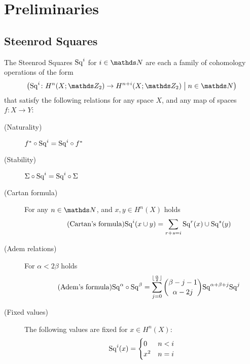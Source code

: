 % 

\chapter{Preliminaries}
\section{Steenrod Squares}

\begin{Def} %
  The Steenrod Squares $\mathrm{Sq}^{i}$ for $i\in\Nat$ are each a family of
  cohomology operations of the form
  \begin{gather*}
    \left(
      \Sq i\colon H^n(X;\Zmod2) \to H^{n+i}(X;\Zmod2)
      \;\middle|\;
      n\in\Nat
    \right)
  \end{gather*}
  that satisfy the following relations for any space $X$, and any map of
  spaces $f\colon X\to Y$:
  \begin{description}
  \item[(Naturality)] ${f}^*\circ\mathrm{Sq}^{i} = \mathrm{Sq}^{i}\circ{f}^*$
  \item[(Stability)] $\Sigma\circ\mathrm{Sq}^{i} = \mathrm{Sq}^{i}\circ\Sigma$ %
  \item[(Cartan formula)] For any $n\in\Nat$, and $x,y\in H^n(X)$ holds
    \begin{gather}\label{cartan}\tag{Cartan's formula}
      \mathrm{Sq}^{i}(x\cup y) = \sum_{r+s=i}\mathrm{Sq}^{r}(x)\cup\mathrm{Sq}^{s}(y)
    \end{gather}
  \item[(Adem relations)] For $\alpha<2\beta$ holds
    \begin{gather}\label{adem}\tag{Adem's formula}
      \mathrm{Sq}^{\alpha} \circ \mathrm{Sq}^{\beta} =
      \sum_{j=0}^{\lfloor \frac \alpha 2 \rfloor}
      \binom{\beta-j-1}{\alpha-2j}
      \mathrm{Sq}^{\alpha+\beta+j}\mathrm{Sq}^{j}
    \end{gather}
  \item[(Fixed values)] The following values are fixed for $x\in H^n(X)$:
    \begin{gather}\label{sqlowerbound}
      \Sq i(x) = \begin{cases}
        0 & n<i \\
        x^2 & n=i
      \end{cases}

\end{gather}
\end{description}
\end{Def}
